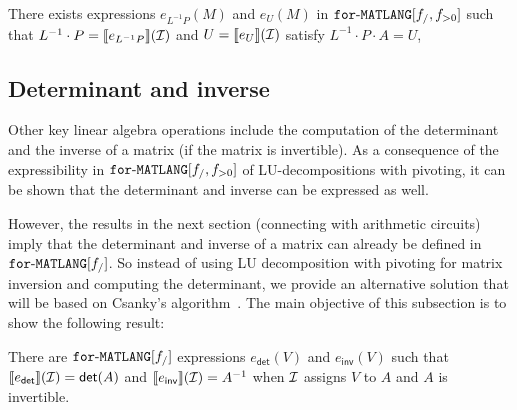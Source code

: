 \begin{proposition}\label{prop:palu}
There exists expressions $e_{L^{-1}P}(M)$ and $e_U(M)$ in $\texttt{for}\text{-}\texttt{MATLANG}[f_/,f_{>0}]$ such that
$L^{-1}\cdot P=\llbracket e_{L^{-1}P} \rrbracket(\mathcal{I})$ and $U=\llbracket e_U \rrbracket(\mathcal{I})$ satisfy $L^{-1}\cdot P\cdot A=U$,
\end{proposition}




\subsection{Determinant and inverse}\label{sec:queries:inverse}
Other key linear algebra operations include the computation of the determinant and
the inverse of a matrix (if the matrix is invertible). As a consequence of the expressibility
in $\texttt{for}\text{-}\texttt{MATLANG}[f_/,f_{>0}]$ of LU-decompositions with pivoting, it can be shown that the determinant
and inverse can be expressed as well. 

However, the results
in the next section (connecting \langfor with arithmetic circuits) imply that the determinant
and inverse of a matrix can already be defined in $\texttt{for}\text{-}\texttt{MATLANG}[f_/]$. So instead of using LU decomposition with pivoting for matrix inversion and computing the determinant, we provide an alternative solution that will be based on Csanky's algorithm~\cite{Csanky76}. The main objective of this subsection is to show the following result:

\begin{proposition}\label{prop:inverse}
    There are $\texttt{for}\text{-}\texttt{MATLANG}[f_/]$ expressions $e_{\mathsf{det}}(V)$ and $e_{\mathsf{inv}}(V)$ such that
    $\llbracket e_{\mathsf{det}} \rrbracket(\mathcal{I})=\mathsf{det}(A)$ and  
    $\llbracket e_{\mathsf{inv}} \rrbracket(\mathcal{I})=A^{-1}$ when $\mathcal{I}$ assigns $V$
    to $A$ and $A$ is invertible.
\end{proposition}

